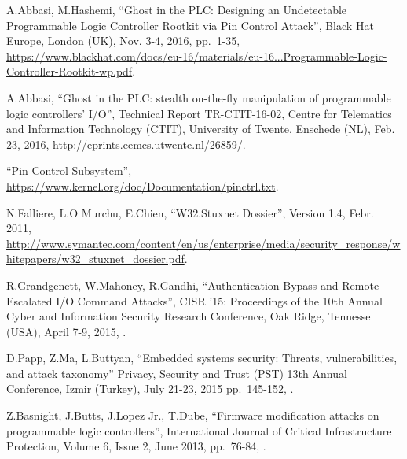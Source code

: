 \begin{thebibliography}{99}

A.Abbasi, M.Hashemi,
``Ghost in the PLC: Designing an Undetectable Programmable Logic Controller Rootkit via Pin Control Attack'',
Black Hat Europe,
London (UK), Nov. 3-4, 2016,
pp.\ 1-35,
\href{https://www.blackhat.com/docs/eu-16/materials/eu-16-Abbasi-Ghost-In-The-PLC-Designing-An-Undetectable-Programmable-Logic-Controller-Rootkit-wp.pdf}{https://www.blackhat.com/docs/eu-16/materials/eu-16...Programmable-Logic-Controller-Rootkit-wp.pdf}.


A.Abbasi,
``Ghost in the PLC: stealth on-the-fly manipulation of programmable logic controllers’ I/O'',
Technical Report TR-CTIT-16-02, Centre for Telematics and Information Technology (CTIT), University of Twente,
Enschede (NL), Feb. 23, 2016,
\url{http://eprints.eemcs.utwente.nl/26859/}.

``Pin Control Subsystem'',
\url{https://www.kernel.org/doc/Documentation/pinctrl.txt}.

N.Falliere, L.O Murchu, E.Chien,
``W32.Stuxnet  Dossier'',
Version 1.4, Febr. 2011,
\url{http://www.symantec.com/content/en/us/enterprise/media/security_response/whitepapers/w32_stuxnet_dossier.pdf}.

R.Grandgenett, W.Mahoney, R.Gandhi,
``Authentication Bypass and Remote Escalated I/O Command Attacks'',
CISR '15: Proceedings of the 10th Annual Cyber and Information Security Research Conference,
Oak Ridge, Tennesse (USA), April 7-9, 2015,
.

D.Papp, Z.Ma, L.Buttyan,
``Embedded systems security: Threats, vulnerabilities, and attack taxonomy''
Privacy, Security and Trust (PST) 13th Annual Conference,
Izmir (Turkey), July 21-23, 2015
pp.\ 145-152,
.

Z.Basnight, J.Butts, J.Lopez Jr., T.Dube,
``Firmware modification attacks on programmable logic controllers'',
International Journal of Critical Infrastructure Protection,
Volume 6, Issue 2, June 2013,
pp.\ 76-84,
.


\end{thebibliography}
